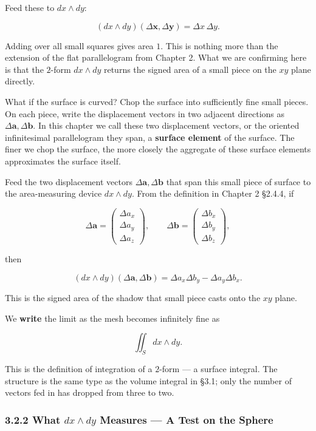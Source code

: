 Feed these to \(dx \wedge dy\):

\[(dx \wedge dy)(\Delta\mathbf{x},\Delta\mathbf{y})=\Delta x\,\Delta y.\]

Adding over all small squares gives area \(1\). This is nothing more
than the extension of the flat parallelogram from Chapter 2. What we are
confirming here is that the \(2\)-form \(dx\wedge dy\) returns the
signed area of a small piece on the \(xy\) plane directly.

What if the surface is curved? Chop the surface into sufficiently fine
small pieces. On each piece, write the displacement vectors in two
adjacent directions as \(\Delta\mathbf{a},\Delta\mathbf{b}\). In this
chapter we call these two displacement vectors, or the oriented
infinitesimal parallelogram they span, a \textbf{surface element} of the
surface. The finer we chop the surface, the more closely the aggregate
of these surface elements approximates the surface itself.

Feed the two displacement vectors \(\Delta\mathbf{a},\Delta\mathbf{b}\)
that span this small piece of surface to the area-measuring device
\(dx \wedge dy\). From the definition in Chapter 2 §2.4.4, if

\[\Delta\mathbf{a}=\begin{pmatrix}\Delta a_x\\\Delta a_y\\\Delta a_z\end{pmatrix},\qquad
\Delta\mathbf{b}=\begin{pmatrix}\Delta b_x\\\Delta b_y\\\Delta b_z\end{pmatrix},\]

then

\[(dx \wedge dy)(\Delta\mathbf{a},\Delta\mathbf{b})
=\Delta a_x\Delta b_y-\Delta a_y\Delta b_x.\]

This is the signed area of the shadow that small piece casts onto the
\(xy\) plane.

We \textbf{write} the limit as the mesh becomes infinitely fine as

\[\iint_S dx \wedge dy.\]

This is the definition of integration of a \(2\)-form --- a surface
integral. The structure is the same type as the volume integral in §3.1;
only the number of vectors fed in has dropped from three to two.

\hypertarget{what-dx-wedge-dy-measures-a-test-on-the-sphere}{%
\subsubsection{\texorpdfstring{3.2.2 What \(dx \wedge dy\) Measures ---
A Test on the
Sphere}{3.2.2 What dx \textbackslash wedge dy Measures --- A Test on the Sphere}}\label{what-dx-wedge-dy-measures-a-test-on-the-sphere}}

